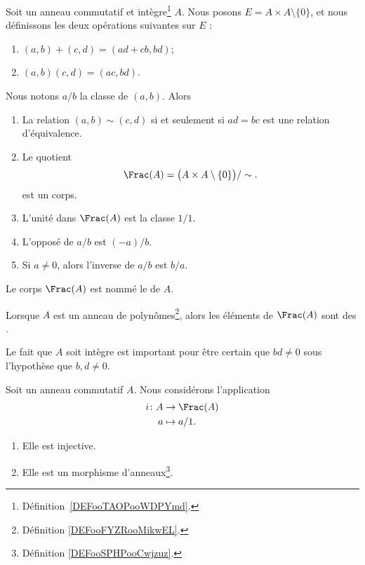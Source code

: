 \begin{propositionDef}       \label{DEFooGJYXooOiJQvP}
	Soit un anneau commutatif et intègre\footnote{Définition~\ref{DEFooTAOPooWDPYmd}.} \( A\). Nous posons \( E=A\times A\setminus\{ 0 \}\), et nous définissons les deux opérations suivantes sur \( E\) :
	\begin{enumerate}
		\item       \label{ITEMooWBWHooYsXFkO}
		      \( (a,b)+(c,d)=(ad+cb,bd)\);
		\item       \label{ITEMooGOOIooCHqLRl}
		      \( (a,b)(c,d)=(ac,bd)\).
	\end{enumerate}
	Nous notons \( a/b\) la classe de \( (a,b)\). Alors
	\begin{enumerate}
		\item

		      La relation \( (a,b)\sim(c,d)\) si et seulement si \( ad=bc\) est une relation d'équivalence.

		\item
		      Le quotient
		      \begin{equation}
			      \Frac(A)=\big( A\times A\setminus\{ 0 \} \big)/\sim.
		      \end{equation}
		      est un corps.
		\item	\label{ITEMooYUNEooAKZJEh}
		      L'unité dans \( \Frac(A)\) est la classe \( 1/1\).
		\item		\label{ITEMooOGPCooAZGWoF}
		      L'opposé de \( a/b\) est \( (-a)/b\).
		\item		\label{ITEMooECDBooJdJEza}
		      Si \( a\neq 0\), alors l'inverse de \( a/b\) est \( b/a\).
	\end{enumerate}

	Le corps \( \Frac(A)\) est nommé le  de \( A\).

	Lorsque \( A\) est un anneau de polynômes\footnote{Définition \ref{DEFooFYZRooMikwEL}.}, alors les éléments de \( \Frac(A)\) sont des .
\end{propositionDef}
Le fait que \( A\) soit intègre est important pour être certain que \( bd\neq 0\) sous l'hypothèse que \( b,d\neq 0\).



\begin{proposition}     \label{PROPooUULNooKbwuEw}
	Soit un anneau commutatif \( A\). Nous considérons l'application
	\begin{equation}
		\begin{aligned}
			i\colon A & \to \Frac(A) \\
			a         & \mapsto a/1.
		\end{aligned}
	\end{equation}
	\begin{enumerate}
		\item
		      Elle est injective.
		\item
		      Elle est un morphisme d'anneaux\footnote{Définition \ref{DEFooSPHPooCwjzuz}.}.
	\end{enumerate}
\end{proposition}


